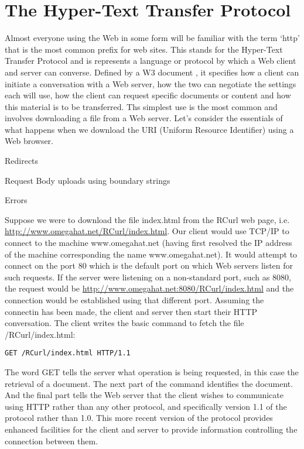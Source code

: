 \documentclass{article}
\begin{document}
\section{The Hyper-Text Transfer Protocol}\label{HTTPOverview}

Almost everyone using the Web in some form will be familiar with the
term `http' that is the most common prefix for web sites.  This stands
for the Hyper-Text Transfer Protocol and is represents a language or
protocol by which a Web client and server can converse.  Defined by a
W3 document \cite{HTTPSpec}, it specifies how a client can initiate a
conversation with a Web server, how the two can negotiate the settings
each will use, how the client can request specific documents or
content and how this material is to be transferred.  Ths simplest use
is the most common and involves downloading a file from a Web server.
Let's consider the essentials of what happens when we download the URI
(Uniform Resource Identifier) using a Web browser.


Redirects
 

Request Body 
 uploads using boundary strings

Errors


Suppose we were to download the file index.html from the RCurl web
page, i.e.  \url{http://www.omegahat.net/RCurl/index.html}.  Our
client would use TCP/IP to connect to the machine www.omegahat.net
(having first resolved the IP address of the machine corresponding the
name www.omegahat.net). It would attempt to connect on the port 80
which is the default port on which Web servers listen for such
requests.  If the server were listening on a non-standard port, such
as 8080, the request would be
\url{http://www.omegahat.net:8080/RCurl/index.html} and the connection
would be established using that different port.
Assuming the connectin has been made, the client and server
then start their HTTP conversation.
The client writes the basic command to fetch the file
/RCurl/index.html:
\begin{verbatim}
GET /RCurl/index.html HTTP/1.1 
\end{verbatim}
The word GET tells the server what operation is being requested, in
this case the retrieval of a document.  The next part of the command
identifies the document.  And the final part tells the Web server that
the client wishes to communicate using HTTP rather than any other
protocol, and specifically version 1.1 of the protocol rather than
1.0.  This more recent version of the protocol provides enhanced
facilities for the client and server to provide information
controlling the connection between them.
\end{document}
